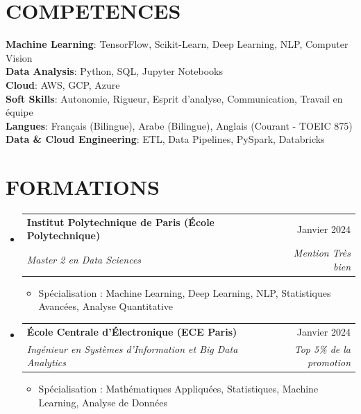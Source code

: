 \documentclass[11pt,a4paper]{article}
\makeatletter
\newcommand{\resumeItem}[1]{
  \item\footnotesize{
    {#1 \vspace{-1pt}}
  }
}
\newcommand{\resumeSubheading}[4]{
  \vspace{2pt}\item
    \begin{tabular*}{\textwidth}[t]{l@{\extracolsep{\fill}}r}
      {\footnotesize\textbf{#1}} & {\footnotesize#2} \\
      {\footnotesize\textit{#3}} & {\footnotesize\textit{#4}} \\
    \end{tabular*}\vspace{2pt}
}
\newcommand{\resumeSubHeadingListStart}{\begin{itemize}[leftmargin=0in, label={}]}
\newcommand{\resumeSubHeadingListEnd}{\end{itemize}}
\newcommand{\resumeItemListStart}{\begin{itemize}[label={\textbullet}]}
\newcommand{\resumeItemListEnd}{\end{itemize}\vspace{0pt}}
\makeatother
\begin{document}
\section{COMPETENCES}
\begin{itemize}[leftmargin=0in, label={}]
\footnotesize{\item{
{\footnotesize\textbf{Machine Learning}:} {\footnotesize TensorFlow, Scikit-Learn, Deep Learning, NLP, Computer Vision} \\
\vspace{3pt}
{\footnotesize\textbf{Data Analysis}:} {\footnotesize Python, SQL, Jupyter Notebooks} \\
\vspace{3pt}
{\footnotesize\textbf{Cloud}:} {\footnotesize AWS, GCP, Azure} \\
\vspace{3pt}
{\footnotesize\textbf{Soft Skills}:} {\footnotesize Autonomie, Rigueur, Esprit d'analyse, Communication, Travail en équipe} \\
\vspace{3pt}
{\footnotesize\textbf{Langues}:} {\footnotesize Français (Bilingue), Arabe (Bilingue), Anglais (Courant - TOEIC 875)} \\
\vspace{3pt}
{\footnotesize\textbf{Data \& Cloud Engineering}:} {\footnotesize ETL, Data Pipelines, PySpark, Databricks}
}
}
\end{itemize}

\section{FORMATIONS}
\resumeSubHeadingListStart
    \resumeSubheading
      {Institut Polytechnique de Paris (École Polytechnique)}
      {Janvier 2024}
      {Master 2 en Data Sciences}
      {Mention Très bien}
      \resumeItemListStart
        \resumeItem{Spécialisation : Machine Learning, Deep Learning, NLP, Statistiques Avancées, Analyse Quantitative}
      \resumeItemListEnd
    \resumeSubheading
      {École Centrale d'Électronique (ECE Paris)}
      {Janvier 2024}
      {Ingénieur en Systèmes d'Information et Big Data Analytics}
      {Top 5\% de la promotion}
      \resumeItemListStart
        \resumeItem{Spécialisation : Mathématiques Appliquées, Statistiques, Machine Learning, Analyse de Données}
      \resumeItemListEnd
  \resumeSubHeadingListEnd
\end{document}

